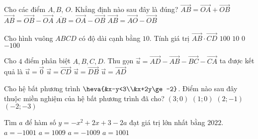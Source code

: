 \begin{ex}%
	Cho các điểm $A, B$, $O$. Khẳng định nào sau đây là đúng?
	\choice
	{$\overrightarrow{A B}=\overrightarrow{O A}+\overrightarrow{O B}$}
	{\True $\overrightarrow{A B}=\overrightarrow{O B}-\overrightarrow{O A}$}
	{$\overline{A B}=\overrightarrow{O A}-\overrightarrow{O B}$}
	{$\overrightarrow{A B}=\overrightarrow{A O}-\overrightarrow{O B}$}
\end{ex}


\begin{ex}%
	Cho hình vuông $ABCD$ có độ dài cạnh bằng $10$. Tính giá trị $\overrightarrow{AB} \cdot \overrightarrow{CD}$
	\choice
	{$100$}
	{$10$}
	{$0$}
	{\True $-100$}
\end{ex}
\begin{ex}%
	Cho $4$ điểm phân biệt $A, B, C, D$. Thu gọn $\overrightarrow{u}=\overrightarrow{AD}-\overrightarrow{AB}-\overrightarrow{BC}-\overrightarrow{CA}$ ta được kết quả là
	\choice
	{$\overrightarrow{u}=\overrightarrow{0}$}
	{$\overrightarrow{u}=\overrightarrow{CD}$}
	{$\overrightarrow{u}=\overrightarrow{DB}$}
	{\True $\overrightarrow{u}=\overrightarrow{AD}$}
\end{ex}
\begin{ex}%
	Cho hệ bất phương trình $\heva{&x-y<3\\&x+2y\ge-2}$. Điểm nào sau đây thuộc miền nghiệm của hệ bất phương trình đã cho?
	\choice
	{$(3 ; 0)$}
	{\True $(1 ; 0)$}
	{$(2 ;-1)$}
	{$(-2 ;-3)$}
\end{ex}
\begin{ex}%
	Tìm $a$ để hàm số $y=-x^2+2x+3-2a$ đạt giá trị lớn nhất bằng $2022$.
	\choice
	{$a=-1001$}
	{$a=1009$}
	{\True $a=-1009$}
	{$a=1001$}
\end{ex}

